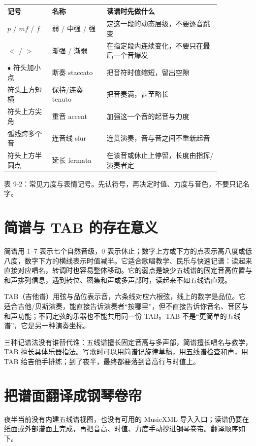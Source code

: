 \begin{center}
\small
\begin{tabular}{p{0.18\linewidth}p{0.22\linewidth}p{0.46\linewidth}}
\toprule
记号 & 名称 & 读谱时先做什么 \\
\midrule
$p$ / $mf$ / $f$ & 弱 / 中强 / 强 & 定这一段的动态层级，不要逐音跳变 \\
$<$ / $>$ & 渐强 / 渐弱 & 在指定段内连续变化，不要只在最后一个音爆发 \\
$\bullet$ 符头加小点 & 断奏 staccato & 把音符时值缩短，留出空隙 \\
符头上方短横 & 保持/连奏 tenuto & 把音奏满，甚至略长 \\
符头上方尖角 & 重音 accent & 加强这一个音的起音与力度 \\
弧线跨多个音 & 连音线 slur & 连贯演奏，音与音之间不重新起音 \\
符头上方半圆点 & 延长 fermata & 在该音或休止上停留，长度由指挥/演奏者定 \\
\bottomrule
\end{tabular}

表 9-2：常见力度与表情记号。先认符号，再决定时值、力度与音色，不要只记名字。
\end{center}

\section{简谱与 TAB 的存在意义}

简谱用 1--7 表示七个自然音级，0 表示休止；数字上方或下方的点表示高八度或低八度，数字下方的横线表示时值减半。它适合歌唱教学、民乐与快速记谱：读起来直接对应唱名，转调时也容易整体移动。它的弱点是缺少五线谱的固定音高位置与和声排列信息，遇到转位、密集和声或多声部时，读起来不如五线谱直观。

TAB（吉他谱）用弦与品位表示音，六条线对应六根弦，线上的数字是品位。它适合吉他/贝斯演奏，能直接告诉演奏者“按哪里”，但不直接告诉你音名、音区与和声功能；不同定弦的乐器也不能共用同一份 TAB。TAB 不是“更简单的五线谱”，它是另一种演奏坐标。

三种记谱法没有谁替代谁：五线谱擅长固定音高与多声部，简谱擅长唱名与教学，TAB 擅长具体乐器指法。写歌时可以用简谱记旋律草稿，用五线谱检查和声，用 TAB 给吉他手排练；到了夜半，最终都要落到音高行与时值上。

\section{把谱面翻译成钢琴卷帘}

夜半当前没有内建五线谱视图，也没有可用的 MusicXML 导入入口；读谱仍要在纸面或外部谱面上完成，再把音高、时值、力度手动抄进钢琴卷帘。翻译顺序如下。

